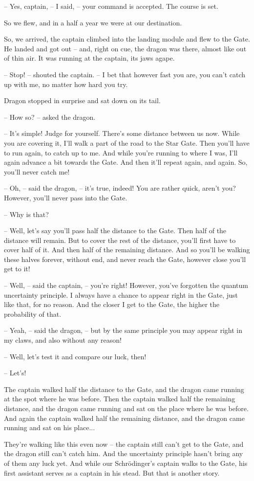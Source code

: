\documentclass[ebook,twoside,final,openright]{memoir}
\begin{document}
– Yes, captain, – I said, – your command is accepted. The course is set.\par
So we flew, and in a half a year we were at our destination.\par
\par
So, we arrived, the captain climbed into the landing module and flew to the Gate. He landed and got out – and, right on cue, the dragon was there, almost like out of thin air. It was running at the captain, its jaws agape.\par
– Stop! – shouted the captain. – I bet that however fast you are, you can’t catch up with me, no matter how hard you try.\par
Dragon stopped in surprise and sat down on its tail.\par
– How so? – asked the dragon.\par
– It’s simple! Judge for yourself. There’s some distance between us now. While you are covering it, I’ll walk a part of the road to the Star Gate. Then you’ll have to run again, to catch up to me. And while you’re running to where I was, I’ll again advance a bit towards the Gate. And then it’ll repeat again, and again. So, you’ll never catch me!\par
– Oh, – said the dragon, – it’s true, indeed! You are rather quick, aren’t you? However, you’ll never pass into the Gate.\par
– Why is that?\par
– Well, let’s say you’ll pass half the distance to the Gate. Then half of the distance will remain. But to cover the rest of the distance, you’ll first have to cover half of it. And then half of the remaining distance. And so you’ll be walking these halves forever, without end, and never reach the Gate, however close you’ll get to it!\par
– Well, – said the captain, – you’re right! However, you’ve forgotten the quantum uncertainty principle. I always have a chance to appear right in the Gate, just like that, for no reason. And the closer I get to the Gate, the higher the probability of that.\par
– Yeah, – said the dragon, – but by the same principle you may appear right in my claws, and also without any reason!\par
– Well, let’s test it and compare our luck, then!\par
– Let’s!\par
\par
The captain walked half the distance to the Gate, and the dragon came running at the spot where he was before. Then the captain walked half the remaining distance, and the dragon came running and sat on the place where he was before. And again the captain walked half the remaining distance, and the dragon came running and sat on his place...\par
\par
They're walking like this even now – the captain still can’t get to the Gate, and the dragon still can’t catch him. And the uncertainty principle hasn’t bring any of them any luck yet. And while our Schrödinger’s captain walks to the Gate, his first assistant serves as a captain in his stead. But that is another story.
\end{document}

